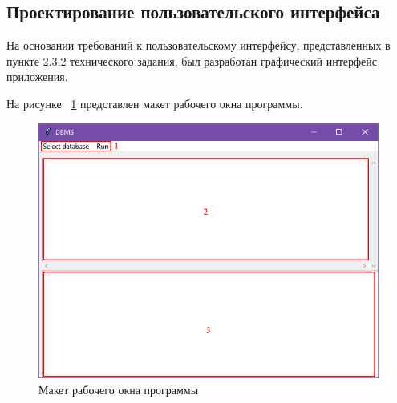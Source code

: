\subsection{Проектирование пользовательского интерфейса}

На основании требований к пользовательскому интерфейсу, представленных в пункте 2.3.2 технического задания, был разработан графический интерфейс приложения.

На рисунке ~\ref{fig:interface} представлен макет рабочего окна программы. 

\begin{figure}[H]
	\centering
	\includegraphics[width=1\linewidth]{images/interface}
	\caption{Макет рабочего окна программы}
	\label{fig:interface}
\end{figure}

